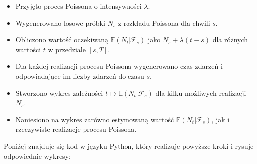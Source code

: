 \documentclass[12pt,letterpaper]{article}
\theoremstyle{definition}
\begin{document}
\begin{itemize}
    \item Przyjęto proces Poissona o intensywności \( \lambda \).
    \item Wygenerowano losowe próbki \( N_s \) z rozkładu Poissona dla chwili \( s \).
    \item Obliczono wartość oczekiwaną \( \mathbb{E}(N_t | \mathcal{F}_s) \) jako \( N_s + \lambda (t - s) \) dla różnych wartości \( t \) w przedziale \([s, T]\).
    \item Dla każdej realizacji procesu Poissona wygenerowano czas zdarzeń i odpowiadające im liczby zdarzeń do czasu \( s \).
    \item Stworzono wykres zależności \( t \mapsto \mathbb{E}(N_t | \mathcal{F}_s) \) dla kilku możliwych realizacji \( N_s \).
    \item Naniesiono na wykres zarówno estymowaną wartość \( \mathbb{E}(N_t | \mathcal{F}_s) \), jak i rzeczywiste realizacje procesu Poissona.
\end{itemize}

Poniżej znajduje się kod w języku Python, który realizuje powyższe kroki i rysuje odpowiednie wykresy:
\end{document}
